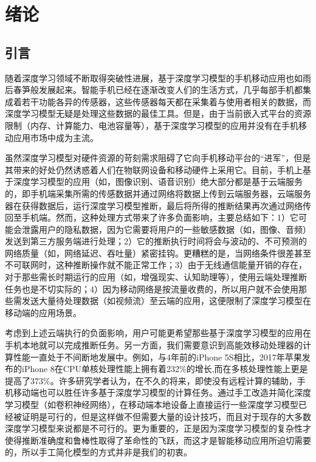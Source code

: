 \chapter{绪论}
\label{chapter:chapter1}
\section{引言}
随着深度学习\cite{lecun2015deep}领域不断取得突破性进展，基于深度学习模型的手机移动应用也如雨后春笋般发展起来。智能手机已经在逐渐改变人们的生活方式，几乎每部手机都集成着若干功能各异的传感器，这些传感器每天都在采集着与使用者相关的数据，而深度学习模型无疑是处理这些数据的最佳工具。但是，由于当前嵌入式平台的资源限制（内存、计算能力、电池容量等），基于深度学习模型的应用并没有在手机移动应用市场中成为主流。

虽然深度学习模型对硬件资源的苛刻需求阻碍了它向手机移动平台的“进军”，但是其带来的好处仍然诱惑着人们在物联网设备和移动硬件上采用它。目前，手机上基于深度学习模型的应用（如，图像识别、语音识别）绝大部分都是基于云端服务的，即手机端采集所需的传感数据并通过网络将数据上传到云端服务器，云端服务器在获得数据后，运行深度学习模型推断，最后将所得的推断结果再次通过网络传回至手机端。然而，这种处理方式带来了许多负面影响，主要总结如下：1）它可能会泄露用户的隐私数据，因为它需要将用户的一些敏感数据（如，图像、音频）发送到第三方服务端进行处理；2）它的推断执行时间将会与波动的、不可预测的网络质量（如，网络延迟、吞吐量）紧密挂钩。更糟糕的是，当网络条件很差甚至不可联网时，这种推断操作就不能正常工作；3）由于无线通信能量开销的存在，对于那些需长时期运行的应用（如，增强现实、认知助理等），使用云端处理推断任务也是不切实际的；4）因为移动网络是按流量收费的，所以用户就不会使用那些需发送大量待处理数据（如视频流）至云端的应用，这便限制了深度学习模型在移动端的应用场景。

考虑到上述云端执行的负面影响，用户可能更希望那些基于深度学习模型的应用在手机本地就可以完成推断任务。另一方面，我们需要意识到高能效移动处理器的计算性能一直处于不间断地发展中。例如，与4年前的iPhone 5S相比，2017年苹果发布的iPhone 8在CPU单核处理性能上拥有着232\%的增长,而在多核处理性能上更是提高了373\%。许多研究学者认为，在不久的将来，即使没有远程计算的辅助，手机移动端也可以胜任许多基于深度学习模型的计算任务。通过手工改造并简化深度学习模型（如卷积神经网络\cite{krizhevsky2012imagenet}），在移动端本地设备上直接运行一些深度学习模型已经被证明是可行的，但是这样做不但需要大量的设计技巧，而且对于现存的大多数深度学习模型来说都是不可行的。更为重要的，正是因为深度学习模型的复杂性才使得推断准确度和鲁棒性取得了革命性的飞跃，而这才是智能移动应用所迫切需要的，所以手工简化模型的方式并非是我们的初衷。

